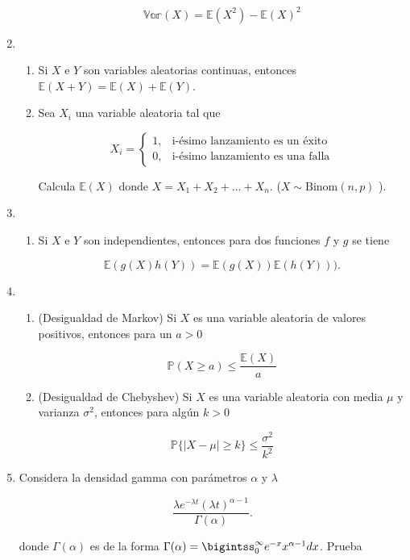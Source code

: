 \documentclass[a4paper,11pt]{report}
\newcommand{\PR}{\mathbb{P}}
\begin{document}
\begin{enumerate}
\begin{enumerate}
\[
\mathbb{Var}(X) = \mathbb{E}(X^2) - \mathbb{E}(X)^2
\]
\end{enumerate}
\item 

\begin{enumerate}
\item Si $X$ e $Y$ son variables aleatorias continuas, entonces $\mathbb{E}(X + Y ) = \mathbb{E}(X) + \mathbb{E}(Y)$.
\item Sea $X_i$ una variable aleatoria tal que 

\[
X_i = \begin{cases}
1, & \text{i-\'esimo lanzamiento es un \'exito}\\
0, & \text{i-\'esimo lanzamiento es una falla}
\end{cases}
\]

Calcula $\mathbb{E}(X)$ donde $X = X_1 +X_2 + \dots + X_n$. ($X \sim \text{Binom}(n,p )$ ).
\end{enumerate}
\item 

\begin{enumerate}
	\item Si $X$ e $Y$ son independientes, entonces para dos funciones $f$ y $g$ se tiene
	
	\[
	\mathbb{E}(g(X)h(Y)) = \mathbb{E}(g(X))\mathbb{E}(h(Y))).
	\]
\end{enumerate}

\item

\begin{enumerate}
	\item (Desigualdad de Markov) Si $X$ es una variable aleatoria de valores positivos, entonces para un $a > 0$
	
	\[
	\PR(X \geq a) \leq \frac{\mathbb{E}(X)}{a}
	\]
\item (Desigualdad de Chebyshev) Si $X$ es una variable aleatoria con media $\mu$ y varianza $\sigma^2$, entonces para alg\'un $k > 0$

\[
\PR\{\vert X - \mu \vert \geq k  \} \leq \frac{\sigma^2}{k^2}
\]
\end{enumerate}

\item Considera la densidad gamma con par\'ametros $\alpha$ y $\lambda$

\[
\frac{\lambda e^{-\lambda t}(\lambda t)^{\alpha -1}}{\Gamma(\alpha)}.
\]

donde $\Gamma(\alpha)$ es de la forma $\Gamma(\alpha) = \bigintss_{0}^{\infty}e^{-x}x^{\alpha - 1}dx $. Prueba


\end{enumerate}
\end{document}
